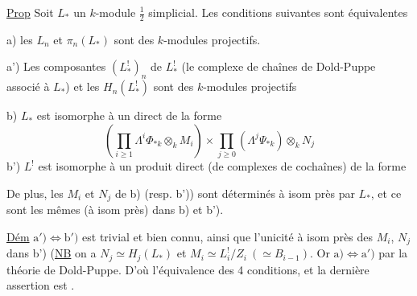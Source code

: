\uline{Prop} Soit $L_*$ un $k$-module $\frac12$ simplicial.
Les conditions suivantes sont équivalentes

a) les $L_n$ et $\pi_n(L_*)$ sont des $k$-modules
projectifs.

a') Les composantes  $(L^!_*)_n$ de $L^!_*$ (le
complexe de chaînes de Dold-Puppe associé à
$L_*$) et les $H_n(L^!_*)$ sont des $k$-modules
projectifs

b) $L_*$ est isomorphe à un  
direct  de la forme
\[
\left(\prod_{i\geq1}\Lambda^i\Phi_{*k}\otimes_k M_i\right)
\times\prod_{j\geq0}(\Lambda^j\Psi_{*k})\otimes_k N_j
\]
 b') $L^!$ est isomorphe à un produit
direct (de complexes de cochaînes) de
la forme

De plus, les $M_i$ et $N_j$ de b) (resp. b'))
sont déterminés à isom près par  $L_*$,
et ce sont les mêmes (à isom près) dans
b) et b').

\uline{Dém} $\mathrm{a'})\Longleftrightarrow\mathrm{b'})$ est trivial et bien connu,
ainsi que l'unicité à isom  près des
$M_i$, $N_j$ dans b') (\uline{NB} on a $N_j\simeq H_j(L_*)$
et $M_i\simeq L_i^!/Z_i\ (\simeq B_{i-1})$\unsure{*}.
Or $\mathrm a)\Longleftrightarrow\mathrm{a'})$
par la théorie de Dold-Puppe. D'où
l'équivalence des 4 conditions, et la dernière
assertion est .
